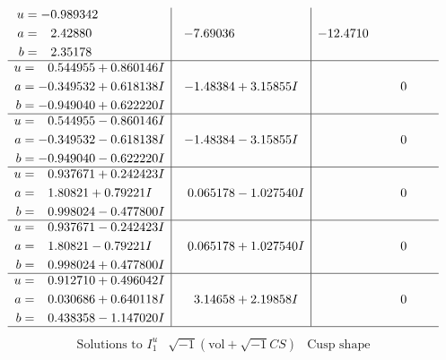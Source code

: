 \documentclass[1p]{elsarticle_modified}
\theoremstyle{definition}
\newcommand{\I}{\sqrt{-1}}
\begin{document}
$$\begin{array}{c|c|c}
\begin{aligned}
u &= -0.989342\phantom{ +0.000000I} \\
a &= \phantom{-}2.42880\phantom{ +0.000000I} \\
b &= \phantom{-}2.35178\phantom{ +0.000000I}\end{aligned}
 & -7.69036\phantom{ +0.000000I} & -12.4710\phantom{ +0.000000I} \\ \hline\begin{aligned}
u &= \phantom{-}0.544955 + 0.860146 I \\
a &= -0.349532 + 0.618138 I \\
b &= -0.949040 + 0.622220 I\end{aligned}
 & -1.48384 + 3.15855 I & \phantom{-0.000000 } 0 \\ \hline\begin{aligned}
u &= \phantom{-}0.544955 - 0.860146 I \\
a &= -0.349532 - 0.618138 I \\
b &= -0.949040 - 0.622220 I\end{aligned}
 & -1.48384 - 3.15855 I & \phantom{-0.000000 } 0 \\ \hline\begin{aligned}
u &= \phantom{-}0.937671 + 0.242423 I \\
a &= \phantom{-}1.80821 + 0.79221 I \\
b &= \phantom{-}0.998024 - 0.477800 I\end{aligned}
 & \phantom{-}0.065178 - 1.027540 I & \phantom{-0.000000 } 0 \\ \hline\begin{aligned}
u &= \phantom{-}0.937671 - 0.242423 I \\
a &= \phantom{-}1.80821 - 0.79221 I \\
b &= \phantom{-}0.998024 + 0.477800 I\end{aligned}
 & \phantom{-}0.065178 + 1.027540 I & \phantom{-0.000000 } 0 \\ \hline\begin{aligned}
u &= \phantom{-}0.912710 + 0.496042 I \\
a &= \phantom{-}0.030686 + 0.640118 I \\
b &= \phantom{-}0.438358 - 1.147020 I\end{aligned}
 & \phantom{-}3.14658 + 2.19858 I & \phantom{-0.000000 } 0\\
 \hline 
 \end{array}$$\newpage$$\begin{array}{c|c|c}  
\text{Solutions to }I^u_{1}& \I (\text{vol} + \sqrt{-1}CS) & \text{Cusp shape}\\

\end{array}$$
\end{document}

